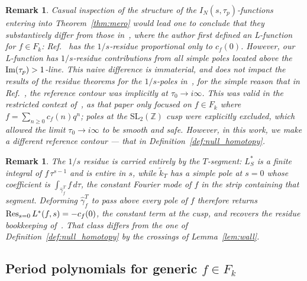 \documentclass[11pt]{article}
\newtheorem{remark}[theorem]{Remark}
\newcommand{\ZZ}{\mathbb{Z}}
\newcommand{\SLZ}{\mathrm{SL}_2(\ZZ)}
\newcommand{\tk}{\widetilde{k}_T}
\begin{document}
\begin{remark}\label{rem:residues}
\emph{Casual inspection of the structure of the $I_N(s, \tau_p)$-functions entering into Theorem~\ref{thm:mero} 
would lead one to conclude that they substantively differ from those in~\cite{1806}, where the author first 
defined an L-function for $f \in F_k$: Ref.~\cite{1806} has the $1/s$-residue proportional only to $c_f(0)$. 
However, our L-function has $1/s$-residue contributions from all \emph{simple} poles located above the 
${\rm Im}(\tau_p) > 1$-line. This naive difference is immaterial, and does not impact the results of the 
residue theorems for the $1/s$-poles in~\cite{1806}, for the simple reason that in Ref.~\cite{1806}, the 
reference contour was implicitly at $\tau_0 \to i \infty$. This was valid in the restricted context of~\cite{1806}, 
as that paper only focused on $f \in F_k$ where $f = \sum_{n \geq 0} c_f(n) q^n$; poles at the $\SLZ$ cusp 
were explicitly excluded, which allowed the limit $\tau_0 \to i \infty$ to be smooth and safe. However, in this 
work, we make a different reference contour --- that in Definition~\ref{def:null_homotopy}. }
\end{remark}

\begin{remark}\label{rem:raised}
\emph{The $1/s$ residue is carried entirely by the $T$-segment: $L^*_S$ is a finite integral of
$f\,\tau^{s-1}$ and is entire in $s$, while $\tk$ has a simple pole at $s=0$ whose coefficient
is $\int_{\hat\gamma_f^T}f\,d\tau$, the constant Fourier mode of $f$ in the strip containing
that segment. Deforming $\hat\gamma_f^T$ to pass above every pole of $f$ therefore returns
$\mathop{\rm Res}_{s=0}L^*(f,s)=-c_f(0)$, the constant term at the cusp, and recovers the
residue bookkeeping of~\cite{1806}. That class differs from the one of
Definition~\ref{def:null_homotopy} by the crossings of Lemma~\ref{lem:wall}.}
\end{remark}

\subsection{Period polynomials for generic $f \in F_k$}
\end{document}
